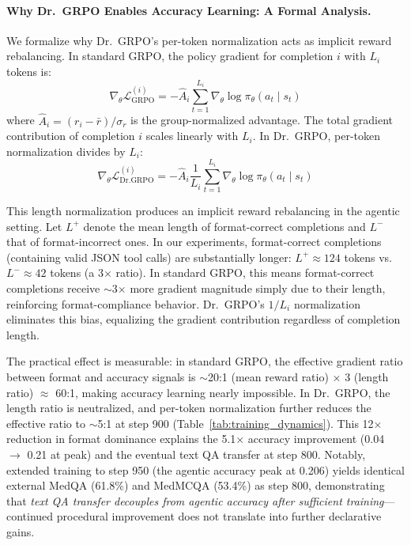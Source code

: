 \documentclass{article}
\begin{document}
\paragraph{Why Dr.~GRPO Enables Accuracy Learning: A Formal Analysis.}
We formalize why Dr.~GRPO's per-token normalization acts as implicit reward rebalancing. In standard GRPO, the policy gradient for completion $i$ with $L_i$ tokens is:
\begin{equation}
\nabla_\theta \mathcal{L}_{\text{GRPO}}^{(i)} = -\hat{A}_i \sum_{t=1}^{L_i} \nabla_\theta \log \pi_\theta(a_t \mid s_t)
\label{eq:grpo_grad}
\end{equation}
where $\hat{A}_i = (r_i - \bar{r}) / \sigma_r$ is the group-normalized advantage. The total gradient contribution of completion $i$ scales linearly with $L_i$. In Dr.~GRPO, per-token normalization divides by $L_i$:
\begin{equation}
\nabla_\theta \mathcal{L}_{\text{Dr.GRPO}}^{(i)} = -\hat{A}_i \frac{1}{L_i} \sum_{t=1}^{L_i} \nabla_\theta \log \pi_\theta(a_t \mid s_t)
\label{eq:drgrpo_grad}
\end{equation}

This length normalization produces an implicit reward rebalancing in the agentic setting. Let $L^+$ denote the mean length of format-correct completions and $L^-$ that of format-incorrect ones. In our experiments, format-correct completions (containing valid JSON tool calls) are substantially longer: $L^+ \approx 124$ tokens vs.\ $L^- \approx 42$ tokens (a 3$\times$ ratio). In standard GRPO, this means format-correct completions receive $\sim$3$\times$ more gradient magnitude simply due to their length, reinforcing format-compliance behavior. Dr.~GRPO's $1/L_i$ normalization eliminates this bias, equalizing the gradient contribution regardless of completion length.

The practical effect is measurable: in standard GRPO, the effective gradient ratio between format and accuracy signals is $\sim$20:1 (mean reward ratio) $\times$ 3 (length ratio) $\approx$ 60:1, making accuracy learning nearly impossible. In Dr.~GRPO, the length ratio is neutralized, and per-token normalization further reduces the effective ratio to $\sim$5:1 at step 900 (Table~\ref{tab:training_dynamics}). This 12$\times$ reduction in format dominance explains the 5.1$\times$ accuracy improvement (0.04 $\to$ 0.21 at peak) and the eventual text QA transfer at step 800. Notably, extended training to step 950 (the agentic accuracy peak at 0.206) yields identical external MedQA (61.8\%) and MedMCQA (53.4\%) as step 800, demonstrating that \emph{text QA transfer decouples from agentic accuracy after sufficient training}---continued procedural improvement does not translate into further declarative gains.
\end{document}

